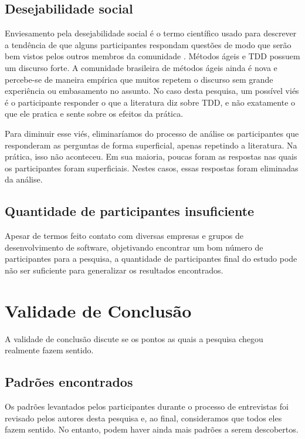 \subsection{Desejabilidade social}

Enviesamento pela desejabilidade social é o termo científico usado para descrever
a tendência de que alguns participantes respondam questões de modo que serão
bem vistos pelos outros membros da comunidade \cite{crowne}.
Métodos ágeis e TDD possuem um discurso forte. A comunidade brasileira de métodos
ágeis ainda é nova e percebe-se de maneira empírica que muitos repetem o discurso
sem grande experiência ou embasamento no assunto.
No caso desta pesquisa, um possível viés é o participante responder o que
a literatura diz sobre TDD, e não exatamente o que ele pratica e sente sobre
os efeitos da prática. 

Para diminuir esse viés, eliminaríamos do processo de análise os participantes
que responderam as perguntas de forma superficial, apenas repetindo a literatura. Na prática,
isso não aconteceu. Em sua maioria, poucas foram as respostas nas quais os participantes
foram superficiais. Nestes casos, essas respostas foram eliminadas da análise.

\subsection{Quantidade de participantes insuficiente}

Apesar de termos feito contato
com diversas empresas e grupos de desenvolvimento de software,
objetivando encontrar um bom número de participantes para a pesquisa,
a quantidade de participantes final do estudo pode não ser suficiente para generalizar
os resultados encontrados. 

\section{Validade de Conclusão}

A validade de conclusão discute se os pontos as quais a pesquisa chegou realmente
fazem sentido.

\subsection{Padrões encontrados}

Os padrões levantados pelos participantes durante o processo de entrevistas
foi revisado pelos autores desta pesquisa e, ao final, consideramos que todos
eles fazem sentido.
No entanto, podem haver ainda mais padrões a serem descobertos.

